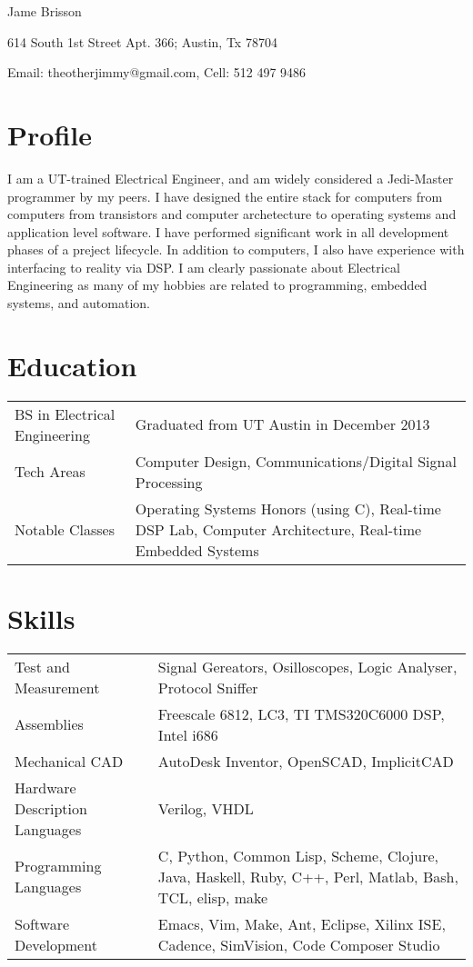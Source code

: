 \documentclass[a4paper,10pt]{article}
\begin{document}
Jame Brisson

614 South 1st Street Apt. 366; Austin, Tx 78704

Email: theotherjimmy@gmail.com, Cell: 512 497 9486

\section{Profile}
I am a UT-trained Electrical Engineer, and am widely considered a Jedi-Master programmer by my peers.
I have designed the entire stack for computers from computers from transistors and computer archetecture to operating systems and application level software. 
I have performed significant work in all development phases of a preject lifecycle.
In addition to computers, I also have experience with interfacing to reality via DSP.
I am clearly passionate about Electrical Engineering as many of my hobbies are related to programming, embedded systems, and automation.

\section{Education}
\begin{tabular}{p{}p{}}
  BS in Electrical Engineering&
  Graduated from UT Austin in December 2013\\
  \noalign{\smallskip}
  Tech Areas&
  Computer Design, Communications/Digital Signal Processing\\
  \noalign{\smallskip}
  Notable Classes&
  Operating Systems Honors (using C), Real-time DSP Lab, Computer Architecture, Real-time Embedded Systems\\
\end{tabular}

\section{Skills}
\begin{tabular}{p{}p{}}
  Test and Measurement&
  Signal Gereators, Osilloscopes, Logic Analyser, Protocol Sniffer\\
  \noalign{\smallskip}
  Assemblies&
  Freescale 6812, LC3, TI TMS320C6000 DSP, Intel i686\\
  \noalign{\smallskip}
  Mechanical CAD&
  AutoDesk Inventor, OpenSCAD, ImplicitCAD\\
  \noalign{\smallskip}
  Hardware Description Languages&
  Verilog, VHDL\\
  \noalign{\smallskip}
  Programming Languages&
  C, Python, Common Lisp, Scheme, Clojure, Java, Haskell, Ruby, C++, Perl, Matlab, Bash, TCL, elisp, make\\
  \noalign{\smallskip}
  Software Development&
  Emacs, Vim, Make, Ant, Eclipse, Xilinx ISE, Cadence, SimVision, Code Composer Studio\\
\end{tabular}
\end{document}
